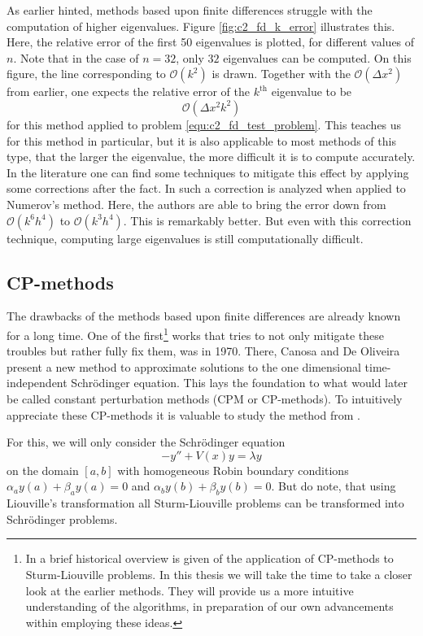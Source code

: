 As earlier hinted, methods based upon finite differences struggle with the computation of higher eigenvalues. Figure \ref{fig:c2_fd_k_error} illustrates this. Here, the relative error of the first 50 eigenvalues is plotted, for different values of $n$. Note that in the case of $n = 32$, only $32$ eigenvalues can be computed. On this figure, the line corresponding to $\mathcal{O}(k^2)$ is drawn. Together with the $\mathcal{O}(\Delta x^2)$ from earlier, one expects the relative error of the $k^\text{th}$ eigenvalue to be
$$
    \mathcal{O}(\Delta x^2 k^2)
$$
for this method applied to problem \eqref{equ:c2_fd_test_problem}. This teaches us for this method in particular, but it is also applicable to most methods of this type, that the larger the eigenvalue, the more difficult it is to compute accurately. In the literature one can find some techniques to mitigate this effect by applying some corrections after the fact. In \cite{andrew_correction_1985} such a correction is analyzed when applied to Numerov's method. Here, the authors are able to bring the error down from $\mathcal{O}(k^6 h^4)$ to $\mathcal{O}(k^3 h^4)$. This is remarkably better. But even with this correction technique, computing large eigenvalues is still computationally difficult.

\subsection{CP-methods}

The drawbacks of the methods based upon finite differences are already known for a long time. One of the first\footnote{In \cite{ledoux_solving_2010} a brief historical overview is given of the application of CP-methods to Sturm-Liouville problems. In this thesis we will take the time to take a closer look at the earlier methods. They will provide us a more intuitive understanding of the algorithms, in preparation of our own advancements within employing these ideas.} works that tries to not only mitigate these troubles but rather fully fix them, was \cite{canosa_new_1970} in 1970. There, Canosa and De Oliveira present a new method to approximate solutions to the one dimensional time-independent Schrödinger equation. This lays the foundation to what would later be called constant perturbation methods (CPM or CP-methods). To intuitively appreciate these CP-methods it is valuable to study the method from \cite{canosa_new_1970}.

For this, we will only consider the Schrödinger equation
\begin{equation}\label{equ:c2_cpm_schrodinger}
    - y'' + V(x) y = \lambda y
\end{equation}
on the domain $[a, b]$ with homogeneous Robin boundary conditions $\alpha_a y(a) + \beta_a y(a) = 0$ and $\alpha_b y(b) + \beta_b y(b) = 0$. But do note, that using Liouville's transformation all Sturm-Liouville problems can be transformed into Schrödinger problems.

